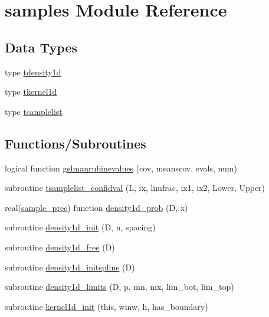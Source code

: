 \hypertarget{namespacesamples}{}\section{samples Module Reference}
\label{namespacesamples}
\subsection*{Data Types}
\begin{DoxyCompactItemize}
\item 
type \mbox{\hyperlink{structsamples_1_1tdensity1d}{tdensity1d}}
\item 
type \mbox{\hyperlink{structsamples_1_1tkernel1d}{tkernel1d}}
\item 
type \mbox{\hyperlink{structsamples_1_1tsamplelist}{tsamplelist}}
\end{DoxyCompactItemize}
\subsection*{Functions/\+Subroutines}
\begin{DoxyCompactItemize}
\item 
logical function \mbox{\hyperlink{namespacesamples_abaa5a3a56f0160fff42cc0ea3ac8a928}{gelmanrubinevalues}} (cov, meanscov, evals, num)
\item 
subroutine \mbox{\hyperlink{namespacesamples_a1c105487cb30dfdb9dc2944330277e78}{tsamplelist\+\_\+confidval}} (L, ix, limfrac, ix1, ix2, Lower, Upper)
\item 
real(\mbox{\hyperlink{namespacesamples_ab1a059d29fb6ed2517c01f6aef7713d3}{sample\+\_\+prec}}) function \mbox{\hyperlink{namespacesamples_afdfd2cef6249d2d52f60f3b946035016}{density1d\+\_\+prob}} (D, x)
\item 
subroutine \mbox{\hyperlink{namespacesamples_a81e4c9e95f7f4a62799689997c7be5e7}{density1d\+\_\+init}} (D, n, spacing)
\item 
subroutine \mbox{\hyperlink{namespacesamples_a106842e32d665154377f9c3bc1682b59}{density1d\+\_\+free}} (D)
\item 
subroutine \mbox{\hyperlink{namespacesamples_a87a98c09efa7d17b3ff7d0db04d66b73}{density1d\+\_\+initspline}} (D)
\item 
subroutine \mbox{\hyperlink{namespacesamples_a65a3ed5d18fe56c9dbc21e5787d86047}{density1d\+\_\+limits}} (D, p, mn, mx, lim\+\_\+bot, lim\+\_\+top)
\item 
subroutine \mbox{\hyperlink{namespacesamples_a34bf342dd43e661799227d0101cee393}{kernel1d\+\_\+init}} (this, winw, h, has\+\_\+boundary)
\end{DoxyCompactItemize}
